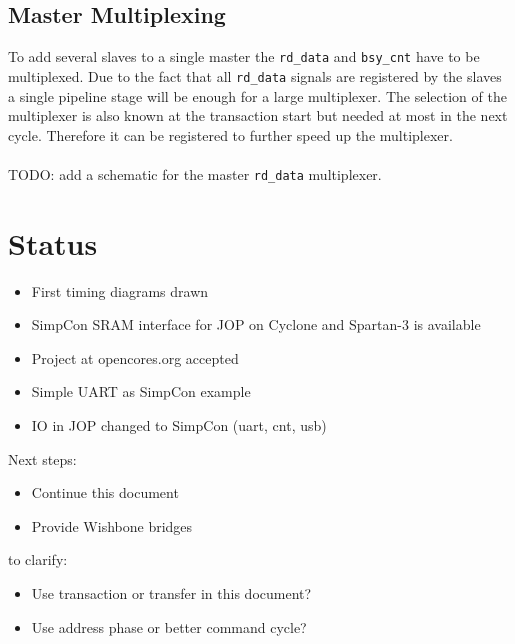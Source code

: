 \documentclass[a4paper,12pt]{scrartcl}
\newcommand{\sign}[1]{{\texttt{#1}}}
\begin{document}
\subsection{Master Multiplexing}

To add several slaves to a single master the \sign{rd\_data} and
\sign{bsy\_cnt} have to be multiplexed. Due to the fact that all
\sign{rd\_data} signals are registered by the slaves a single
pipeline stage will be enough for a large multiplexer. The selection
of the multiplexer is also known at the transaction start but needed
at most in the next cycle. Therefore it can be registered to further
speed up the multiplexer.
\\
\\
TODO: add a schematic for the master \sign{rd\_data} multiplexer.

\section{Status}

\begin{itemize}
    \item First timing diagrams drawn
    \item SimpCon SRAM interface for JOP on Cyclone and Spartan-3 is
    available
    \item Project at opencores.org accepted
    \item Simple UART as SimpCon example
    \item IO in JOP changed to SimpCon (uart, cnt, usb)
\end{itemize}
%
Next steps:
%
\begin{itemize}
    \item Continue this document
    \item Provide Wishbone bridges
\end{itemize}
%
to clarify:
\begin{itemize}
    \item Use transaction or transfer in this document?
    \item Use address phase or better command cycle?
\end{itemize}
\end{document}
